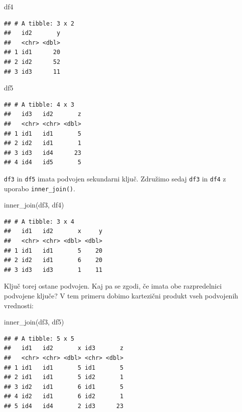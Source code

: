 \documentclass[
]{book}
\newenvironment{Shaded}{\begin{snugshade}}{\end{snugshade}}
\newcommand{\FunctionTok}[1]{\textcolor[rgb]{0.00,0.00,0.00}{#1}}
\newcommand{\NormalTok}[1]{#1}
\begin{document}
\begin{Shaded}
\begin{Highlighting}[]
\NormalTok{df4}
\end{Highlighting}
\end{Shaded}

\begin{verbatim}
## # A tibble: 3 x 2
##   id2       y
##   <chr> <dbl>
## 1 id1      20
## 2 id2      52
## 3 id3      11
\end{verbatim}

\begin{Shaded}
\begin{Highlighting}[]
\NormalTok{df5}
\end{Highlighting}
\end{Shaded}

\begin{verbatim}
## # A tibble: 4 x 3
##   id3   id2       z
##   <chr> <chr> <dbl>
## 1 id1   id1       5
## 2 id2   id1       1
## 3 id3   id4      23
## 4 id4   id5       5
\end{verbatim}

\texttt{df3} in \texttt{df5} imata podvojen sekundarni ključ. Združimo sedaj \texttt{df3} in \texttt{df4} z uporabo \texttt{inner\_join()}.

\begin{Shaded}
\begin{Highlighting}[]
\FunctionTok{inner\_join}\NormalTok{(df3, df4)}
\end{Highlighting}
\end{Shaded}

\begin{verbatim}
## # A tibble: 3 x 4
##   id1   id2       x     y
##   <chr> <chr> <dbl> <dbl>
## 1 id1   id1       5    20
## 2 id2   id1       6    20
## 3 id3   id3       1    11
\end{verbatim}

Ključ torej ostane podvojen. Kaj pa se zgodi, če imata obe razpredelnici podvojene ključe? V tem primeru dobimo kartezični produkt vseh podvojenih vrednosti:

\begin{Shaded}
\begin{Highlighting}[]
\FunctionTok{inner\_join}\NormalTok{(df3, df5)}
\end{Highlighting}
\end{Shaded}

\begin{verbatim}
## # A tibble: 5 x 5
##   id1   id2       x id3       z
##   <chr> <chr> <dbl> <chr> <dbl>
## 1 id1   id1       5 id1       5
## 2 id1   id1       5 id2       1
## 3 id2   id1       6 id1       5
## 4 id2   id1       6 id2       1
## 5 id4   id4       2 id3      23
\end{verbatim}
\end{document}
